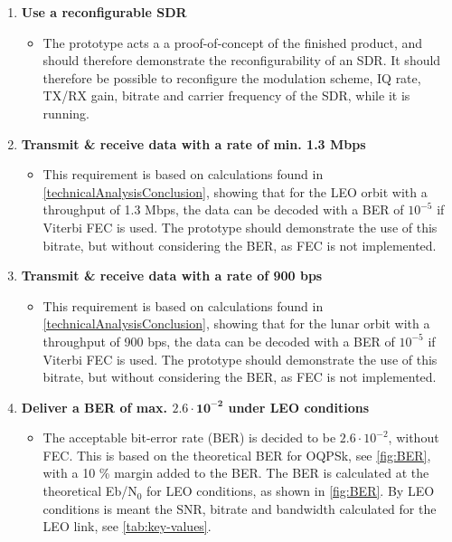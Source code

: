 \begin{enumerate}[label=\textbf{\arabic*})]
\item \textbf{Use a reconfigurable SDR}
\begin{itemize}
\item[] The prototype acts a a proof-of-concept of the finished product, and should therefore demonstrate the reconfigurability of an SDR. It should therefore be possible to reconfigure the modulation scheme, IQ rate, TX/RX gain, bitrate and carrier frequency of the SDR, while it is running.
\end{itemize}

\item \textbf{Transmit \& receive data with a rate of min. 1.3 Mbps}
\begin{itemize}
\item[] This requirement is based on calculations found in \autoref{technicalAnalysisConclusion}, showing that for the LEO orbit with a throughput of 1.3 Mbps, the data can be decoded with a BER of ${10^{-5}}$ if Viterbi FEC is used. The prototype should demonstrate the use of this bitrate, but without considering the BER, as FEC is not implemented.
\end{itemize}

\item \textbf{Transmit \& receive data with a rate of 900 bps}
\begin{itemize}
\item[] This requirement is based on calculations found in \autoref{technicalAnalysisConclusion}, showing that for the lunar orbit with a throughput of 900 bps, the data can be decoded with a BER of ${10^{-5}}$ if Viterbi FEC is used. The prototype should demonstrate the use of this bitrate, but without considering the BER, as FEC is not implemented.
\end{itemize}

\item \textbf{Deliver a BER of max. $\mathbf{2.6\cdot10^{-2}}$ under LEO conditions}
\begin{itemize}
\item[] The acceptable bit-error rate (BER) is decided to be $2.6\cdot10^{-2}$, without FEC. This is based on the theoretical BER for OQPSk, see \autoref{fig:BER}, with a 10 \% margin added to the BER. The BER is calculated at the theoretical Eb/N$_0$ for LEO conditions, as shown in \autoref{fig:BER}. By LEO conditions is meant the SNR, bitrate and bandwidth calculated for the LEO link, see \autoref{tab:key-values}.
\end{itemize}


\end{enumerate}
